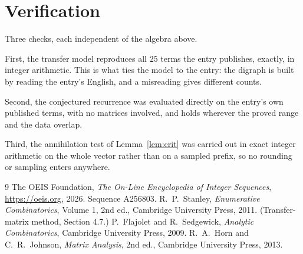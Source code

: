 \documentclass[11pt,a4paper]{article}
\theoremstyle{plain}
\theoremstyle{definition}
\begin{document}
\section{Verification}

Three checks, each independent of the algebra above.

First, the transfer model reproduces all $25$ terms the entry publishes, exactly, in
integer arithmetic. This is what ties the model to the entry: the digraph is built by reading
the entry's English, and a misreading gives different counts.

Second, the conjectured recurrence was evaluated directly on the entry's own published terms,
with no matrices involved, and holds wherever the proved range and the data overlap.

Third, the annihilation test of Lemma~\ref{lem:crit} was carried out in exact integer
arithmetic on the whole vector rather than on a sampled prefix, so no rounding or sampling
enters anywhere.

\begin{thebibliography}{9}
 The OEIS Foundation, \emph{The On-Line Encyclopedia of Integer
Sequences}, \url{https://oeis.org}, 2026. Sequence A256803.
 R.~P.~Stanley, \emph{Enumerative Combinatorics}, Volume 1, 2nd ed.,
Cambridge University Press, 2011. (Transfer-matrix method, Section 4.7.)
 P.~Flajolet and R.~Sedgewick, \emph{Analytic Combinatorics}, Cambridge
University Press, 2009.
 R.~A.~Horn and C.~R.~Johnson, \emph{Matrix Analysis}, 2nd ed., Cambridge
University Press, 2013.
\end{thebibliography}
\end{document}
